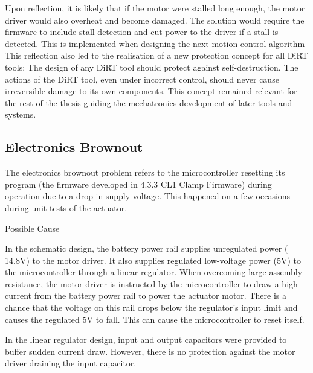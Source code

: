 Upon reflection, it is likely that if the motor were stalled long enough, the motor driver would also overheat and become damaged. The solution would require the firmware to include stall detection and cut power to the driver if a stall is detected. This is implemented when designing the next motion control algorithm 
This reflection also led to the realisation of a new protection concept for all DiRT tools: The design of any DiRT tool should protect against self-destruction. The actions of the DiRT tool, even under incorrect control, should never cause irreversible damage to its own components. This concept remained relevant for the rest of the thesis guiding the mechatronics development of later tools and systems.

\subsection{Electronics Brownout}
\label{subsection:exploration-1-electronics-brownout}

The electronics brownout problem refers to the microcontroller resetting its program (the firmware developed in 4.3.3 CL1 Clamp Firmware) during operation due to a drop in supply voltage. This happened on a few occasions during unit tests of the actuator.

Possible Cause

In the schematic design, the battery power rail supplies unregulated power (~ 14.8V) to the motor driver. It also supplies regulated low-voltage power (5V) to the microcontroller through a linear regulator. When overcoming large assembly resistance, the motor driver is instructed by the microcontroller to draw a high current from the battery power rail to power the actuator motor. There is a chance that the voltage on this rail drops below the regulator’s input limit and causes the regulated 5V to fall. This can cause the microcontroller to reset itself.

In the linear regulator design, input and output capacitors were provided to buffer sudden current draw. However, there is no protection against the motor driver draining the input capacitor.

